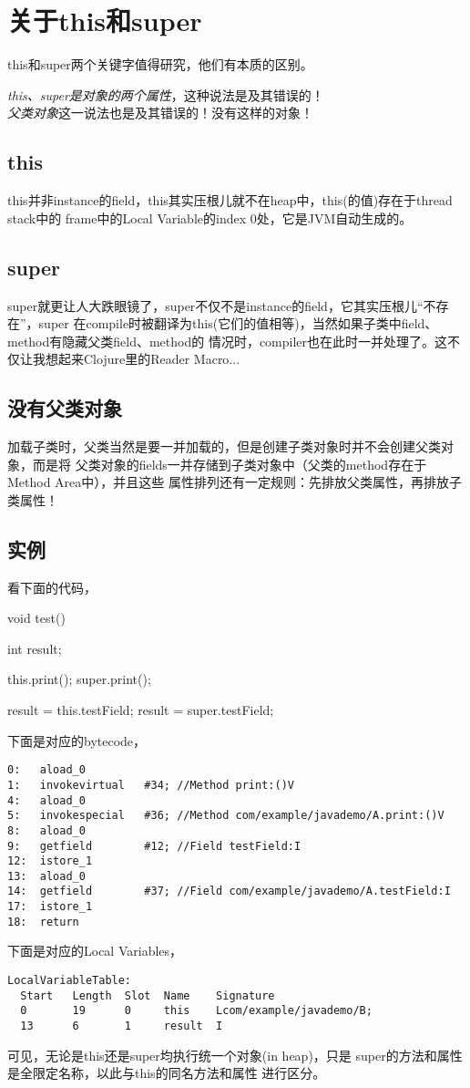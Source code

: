 ﻿\section[关于this和super]{关于this和super}
this和super两个关键字值得研究，他们有本质的区别。

\emph{this、super是对象的两个属性}，这种说法是及其错误的！\\
\emph{父类对象}这一说法也是及其错误的！没有这样的对象！

\subsection[this]{this}
this并非instance的field，this其实压根儿就不在heap中，this(的值)存在于thread stack中的
frame中的Local Variable的index 0处，它是JVM自动生成的。

\subsection[super]{super}
super就更让人大跌眼镜了，super不仅不是instance的field，它其实压根儿“不存在”，super
在compile时被翻译为this(它们的值相等)，当然如果子类中field、method有隐藏父类field、method的
情况时，compiler也在此时一并处理了。这不仅让我想起来Clojure里的Reader Macro...

\subsection[没有父类对象]{没有父类对象}
加载子类时，父类当然是要一并加载的，但是创建子类对象时并不会创建父类对象，而是将
父类对象的fields一并存储到子类对象中（父类的method存在于Method Area中），并且这些
属性排列还有一定规则：先排放父类属性，再排放子类属性！

\subsection[Example]{实例}
看下面的代码，

\begin{javacode}
void test() {
  int result;

  this.print();
  super.print();

  result = this.testField;
  result = super.testField;
}
\end{javacode}

下面是对应的bytecode，
\begin{verbatim}
0:   aload_0
1:   invokevirtual   #34; //Method print:()V
4:   aload_0
5:   invokespecial   #36; //Method com/example/javademo/A.print:()V
8:   aload_0
9:   getfield        #12; //Field testField:I
12:  istore_1
13:  aload_0
14:  getfield        #37; //Field com/example/javademo/A.testField:I
17:  istore_1
18:  return
\end{verbatim}

下面是对应的Local Variables，
\begin{verbatim}
LocalVariableTable:
  Start   Length  Slot  Name    Signature
  0       19      0     this    Lcom/example/javademo/B;
  13      6       1     result  I
\end{verbatim}

可见，无论是this还是super均执行统一个对象(in heap)，只是
super的方法和属性是全限定名称，以此与this的同名方法和属性
进行区分。